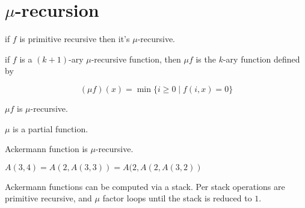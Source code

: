 \section{\texorpdfstring{$\mu$}{μ}-recursion}

\begin{definition}[$\mu$-recursion]
if $f$ is primitive recursive then it's $\mu$-recursive.

if $f$ is a $(k+1)$-ary $\mu$-recursive function, then $\mu f$ is the $k$-ary function defined by

$$(\mu f)(x) = \min\{i \ge 0 \mid f(i,x) = 0\}$$

$\mu f$ is $\mu$-recursive.
\end{definition}

$\mu$ is a partial function.

Ackermann function is $\mu$-recursive.

\begin{observation}
$A(3,4) = A(2, A(3,3)) = A(2, A(2,A(3,2))$
\end{observation}

Ackermann functions can be computed via a stack. Per stack operations are primitive recursive, and $\mu$ factor loops until the stack is reduced to $1$.